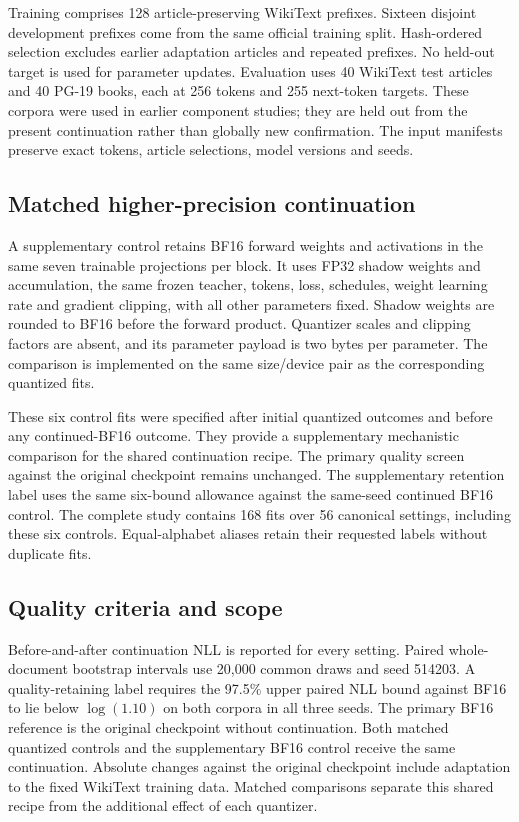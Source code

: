\documentclass[11pt]{article}
\begin{document}
Training comprises 128 article-preserving WikiText prefixes. Sixteen
disjoint development prefixes come from the same official training split.
Hash-ordered selection excludes earlier adaptation articles and repeated
prefixes. No held-out target is used for parameter updates. Evaluation uses
40 WikiText test articles and 40 PG-19 books, each at 256 tokens and 255
next-token targets. These corpora were used in earlier component studies;
they are held out from the present continuation rather than globally new
confirmation. The input manifests preserve exact tokens, article selections,
model versions and seeds.

\subsection{Matched higher-precision continuation}

A supplementary control retains BF16 forward weights and activations in
the same seven trainable projections per block. It uses FP32 shadow
weights and accumulation, the same frozen teacher, tokens, loss, schedules,
weight learning rate and gradient clipping, with all other parameters fixed.
Shadow weights are rounded to BF16 before the forward product. Quantizer
scales and clipping factors are absent, and its parameter payload is two
bytes per parameter. The comparison is implemented on the same size/device
pair as the corresponding quantized fits.

These six control fits were specified after initial quantized outcomes and
before any continued-BF16 outcome. They provide a supplementary mechanistic
comparison for the shared continuation recipe. The primary quality screen
against the original checkpoint remains unchanged. The supplementary
retention label uses the same six-bound allowance against the same-seed
continued BF16 control. The complete study contains 168 fits over 56
canonical settings, including these six controls. Equal-alphabet aliases
retain their requested labels without duplicate fits.

\subsection{Quality criteria and scope}

Before-and-after continuation NLL is reported for every setting. Paired
whole-document bootstrap intervals use 20,000 common draws and seed 514203.
A quality-retaining label requires the 97.5\% upper paired NLL bound against
BF16 to lie below \(\log(1.10)\) on both corpora in all three seeds.
The primary BF16 reference is the original checkpoint without continuation.
Both matched quantized controls and the supplementary BF16 control receive
the same continuation. Absolute changes against the original checkpoint
include adaptation to the fixed WikiText training data. Matched comparisons
separate this shared recipe from the additional effect of each quantizer.
\end{document}
